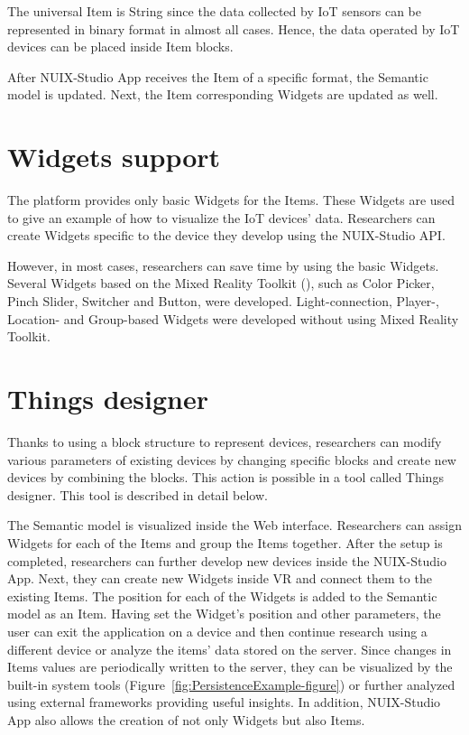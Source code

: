 The universal Item is String since the data collected by IoT sensors can be represented in binary format in almost all cases. Hence, the data operated by IoT devices can be placed inside Item blocks.

After NUIX-Studio App receives the Item of a specific format, the Semantic model is updated. Next, the Item corresponding Widgets are updated as well.

\section{Widgets support}

The platform provides only basic Widgets for the Items. These Widgets are used to give an example of how to visualize the IoT devices' data. Researchers can create Widgets specific to the device they develop using the NUIX-Studio API.

However, in most cases, researchers can save time by using the basic Widgets. Several Widgets based on the Mixed Reality Toolkit (\cite{MRTK2021}), such as Color Picker, Pinch Slider, Switcher and Button, were developed. Light-connection, Player-, Location- and Group-based Widgets were developed without using Mixed Reality Toolkit.

\section{Things designer}

Thanks to using a block structure to represent devices, researchers can modify various parameters of existing devices by changing specific blocks and create new devices by combining the blocks. This action is possible in a tool called Things designer. This tool is described in detail below.

The Semantic model is visualized inside the Web interface. Researchers can assign Widgets for each of the Items and group the Items together. After the setup is completed, researchers can further develop new devices inside the NUIX-Studio App. Next, they can create new Widgets inside VR and connect them to the existing Items. The position for each of the Widgets is added to the Semantic model as an Item. Having set the Widget's position and other parameters, the user can exit the application on a device and then continue research using a different device or analyze the items' data stored on the server. Since changes in Items values are periodically written to the server, they can be visualized by the built-in system tools (Figure~\ref{fig:PersistenceExample-figure}) or further analyzed using external frameworks providing useful insights. In addition, NUIX-Studio App also allows the creation of not only Widgets but also Items.

